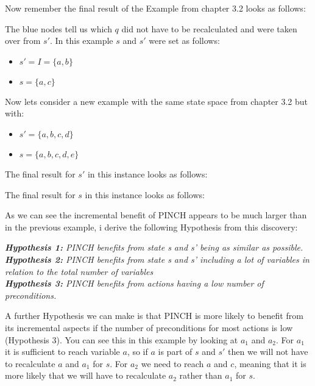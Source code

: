 Now remember the final result of the Example from chapter 3.2 looks as follows:

The blue nodes tell us which $q$ did not have to be recalculated and were taken over from $s'$. In this example $s$ and $s'$ were set as follows:
\begin{center}
\begin{multicols}{2}
\begin{itemize}
\setlength\itemsep{0em}
\item $s' = I = \{a,b\}$
\item $s = \{a,c\}$
\end{itemize}
\end{multicols}
\end{center}
Now lets consider a new example with the same state space from chapter 3.2 but with:
\begin{center}
\begin{multicols}{2}
\begin{itemize}
\setlength\itemsep{0em}
\item $s' = \{a,b,c,d\}$
\item $s = \{a,b,c,d,e\}$
\end{itemize}
\end{multicols}
\end{center}
\newpage
The final result for $s'$ in this instance looks as follows:

The final result for $s$ in this instance looks as follows: 

As we can see the incremental benefit of PINCH appears to be much larger than in the previous example, i derive the following Hypothesis from this discovery:\\

\begin{center}
\textit{\textbf{Hypothesis 1:} PINCH benefits from state s and s' being as similar as possible.}\\
\textit{\textbf{Hypothesis 2:} PINCH benefits from state s and s' including a lot of variables in relation to the total number of variables}\\
\textit{\textbf{Hypothesis 3:} PINCH benefits from actions having a low number of preconditions.}
\end{center}
A further Hypothesis we can make is that PINCH is more likely to benefit from its incremental aspects if the number of preconditions for most actions is low (Hypothesis 3). You can see this in this example by looking at $a_1$ and $a_2$. For $a_1$ it is sufficient to reach variable $a$, so if $a$ is part of $s$ and $s'$ then we will not have to recalculate $a$ and $a_1$ for $s$. For $a_2$ we need to reach $a$ and $c$, meaning that it is more likely that we will have to recalculate $a_2$ rather than $a_1$ for $s$.


 